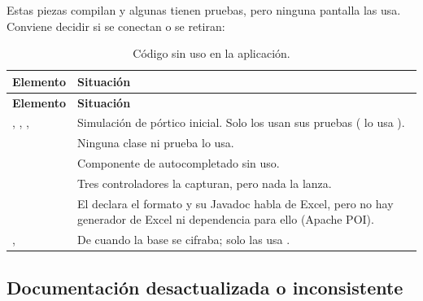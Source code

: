 Estas piezas compilan y algunas tienen pruebas, pero ninguna pantalla las usa. Conviene decidir si se conectan o se
retiran:

\begin{longtable}{L{5.2cm}L{9.6cm}}
	\caption{Código sin uso en la aplicación.} \label{tab:lim-sin-uso} \\
	\hline
	\textbf{Elemento} & \textbf{Situación} \\ \hline
	\endfirsthead
	\hline
	\textbf{Elemento} & \textbf{Situación} \\ \hline
	\endhead
	\hline
	\endfoot
	, , ,  & Simulación de
	pórtico inicial. Solo los usan sus pruebas ( lo usa ). \\
	 & Ninguna clase ni prueba lo usa. \\
	 & Componente de autocompletado sin uso. \\
	 & Tres controladores la capturan, pero nada la lanza. \\
	 & El  declara el formato  y su Javadoc habla de Excel,
	pero no hay generador de Excel ni dependencia para ello (Apache POI). \\
	,  & De cuando la base se
	cifraba; solo las usa . \\
\end{longtable}

\subsection{Documentación desactualizada o inconsistente}

